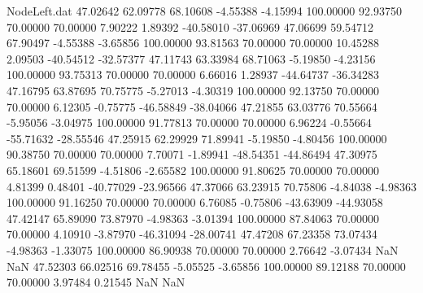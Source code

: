 \begin{filecontents}{NodeLeft.dat}
  47.02642   62.09778   68.10608    -4.55388   -4.15994  100.00000   92.93750   70.00000   70.00000    7.90222    1.89392  -40.58010  -37.06969
  47.06699   59.54712   67.90497    -4.55388   -3.65856  100.00000   93.81563   70.00000   70.00000   10.45288    2.09503  -40.54512  -32.57377
  47.11743   63.33984   68.71063    -5.19850   -4.23156  100.00000   93.75313   70.00000   70.00000    6.66016    1.28937  -44.64737  -36.34283
  47.16795   63.87695   70.75775    -5.27013   -4.30319  100.00000   92.13750   70.00000   70.00000    6.12305   -0.75775  -46.58849  -38.04066
  47.21855   63.03776   70.55664    -5.95056   -3.04975  100.00000   91.77813   70.00000   70.00000    6.96224   -0.55664  -55.71632  -28.55546
  47.25915   62.29929   71.89941    -5.19850   -4.80456  100.00000   90.38750   70.00000   70.00000    7.70071   -1.89941  -48.54351  -44.86494
  47.30975   65.18601   69.51599    -4.51806   -2.65582  100.00000   91.80625   70.00000   70.00000    4.81399    0.48401  -40.77029  -23.96566
  47.37066   63.23915   70.75806    -4.84038   -4.98363  100.00000   91.16250   70.00000   70.00000    6.76085   -0.75806  -43.63909  -44.93058
  47.42147   65.89090   73.87970    -4.98363   -3.01394  100.00000   87.84063   70.00000   70.00000    4.10910   -3.87970  -46.31094  -28.00741
  47.47208   67.23358   73.07434    -4.98363   -1.33075  100.00000   86.90938   70.00000   70.00000    2.76642   -3.07434        NaN        NaN
  47.52303   66.02516   69.78455    -5.05525   -3.65856  100.00000   89.12188   70.00000   70.00000    3.97484    0.21545        NaN        NaN
\end{filecontents}
